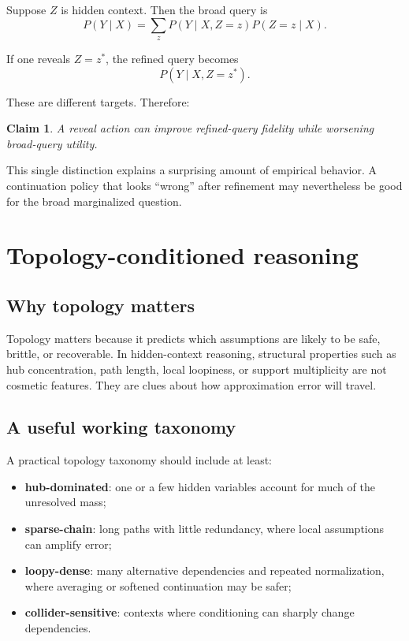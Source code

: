 \documentclass[11pt]{article}
\newtheorem{claim}{Claim}
\begin{document}
Suppose $Z$ is hidden context. Then the broad query is
\begin{equation}
P(Y \mid X) = \sum_z P(Y \mid X, Z=z)P(Z=z \mid X).
\end{equation}

If one reveals $Z=z^\ast$, the refined query becomes
\begin{equation}
P(Y \mid X, Z=z^\ast).
\end{equation}

These are different targets. Therefore:
\begin{claim}
A reveal action can improve refined-query fidelity while worsening broad-query utility.
\end{claim}

This single distinction explains a surprising amount of empirical behavior. A continuation policy that looks ``wrong'' after refinement may nevertheless be good for the broad marginalized question.

\section{Topology-conditioned reasoning}
\subsection{Why topology matters}
Topology matters because it predicts which assumptions are likely to be safe, brittle, or recoverable. In hidden-context reasoning, structural properties such as hub concentration, path length, local loopiness, or support multiplicity are not cosmetic features. They are clues about how approximation error will travel.

\subsection{A useful working taxonomy}
A practical topology taxonomy should include at least:
\begin{itemize}
    \item \textbf{hub-dominated}: one or a few hidden variables account for much of the unresolved mass;
    \item \textbf{sparse-chain}: long paths with little redundancy, where local assumptions can amplify error;
    \item \textbf{loopy-dense}: many alternative dependencies and repeated normalization, where averaging or softened continuation may be safer;
    \item \textbf{collider-sensitive}: contexts where conditioning can sharply change dependencies.
\end{itemize}
\end{document}
